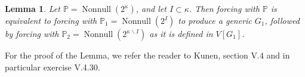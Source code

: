 \documentclass[11pt,oneside]{amsbook}
\newcommand{\set}[1]{\left\{\,#1\,\right\}}
\newcommand{\PP}{\mathbb P}
\DeclareMathOperator{\Nonnull}{Nonnull}
\theoremstyle{definition}
\theoremstyle{plain}
\newtheorem{lemma}[theorem]{Lemma}
\theoremstyle{definition}
\theoremstyle{remark}
\numberwithin{equation}{section}
\numberwithin{figure}{section}
\begin{document}
%

\begin{lemma}
  Let $\PP=\Nonnull(2^\kappa)$, and let $I\subset\kappa$. Then forcing with $\PP$ is equivalent to forcing with $\PP_1=\Nonnull(2^I)$ to produce a generic $G_1$, followed by forcing with $\PP_2=\Nonnull(2^{\kappa\smallsetminus I})$ as it is defined in $V[G_1]$.
\end{lemma}

For the proof of the Lemma, we refer the reader to Kunen, section V.4 and in particular exercise V.4.30.
\end{document}
